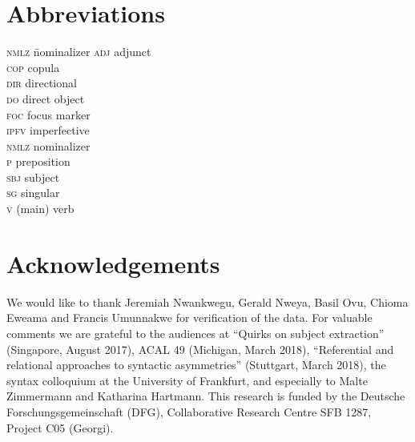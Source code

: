 \documentclass[output=paper,colorlinks,citecolor=brown]{langscibook}
\begin{document}
\section*{Abbreviations}
\begin{multicols}{3}
\begin{tabbing}
  \textsc{nmlz} \hspace{1ex}  \= nominalizer\kill
  \textsc{adj}    \> adjunct\\
  \textsc{cop}    \> copula\\
  \textsc{dir}    \> directional\\
  \textsc{do}     \> direct object\\
  \textsc{foc}    \> focus marker\\
  \textsc{ipfv}   \> imperfective\\
  \textsc{nmlz}   \> nominalizer\\
  \textsc{p}      \> preposition\\
  \textsc{sbj}    \> subject\\
  \textsc{sg}     \> singular\\
  \textsc{v}      \> (main) verb
\end{tabbing}
\end{multicols}

\section*{Acknowledgements}
We would like to thank Jeremiah Nwankwegu, Gerald Nweya, Basil Ovu, Chioma Eweama and Francis Umunnakwe for verification of the  data. For valuable comments we are grateful to the audiences at ``Quirks on subject extraction'' (Singapore, August 2017), ACAL 49 (Michigan, March 2018), ``Referential and relational approaches to syntactic asymmetries'' (Stuttgart, March 2018), the syntax colloquium at the University of Frankfurt, and especially to Malte Zimmermann and Katharina Hartmann. This research is funded by the Deutsche Forschungsgemeinschaft (DFG), Collaborative Research Centre SFB 1287, Project C05 (Georgi).

{\sloppy\printbibliography[heading=subbibliography,notkeyword=this]}
\end{document}
